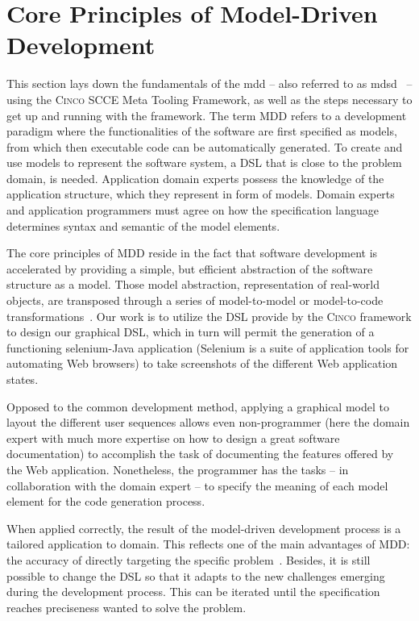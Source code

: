 \section{Core Principles of Model-Driven Development}


This section lays down the fundamentals of the \gls{mdd} -- also referred to as \gls{mdsd}~\cite{fowler} --  using the \textsc{Cinco} SCCE Meta Tooling Framework, as well as the steps necessary to get up and running with the framework. The term MDD refers to a development paradigm where the functionalities of the software are first specified as models, from which then executable code can be automatically generated. To create and use models to represent the software system, a DSL that is close to the problem domain, is needed. Application domain experts possess the knowledge of the application structure, which they represent in form of models. Domain experts and application programmers must agree on how the specification language determines syntax and semantic of the model elements.

The core principles of MDD reside in the fact that software development is accelerated by providing a simple, but efficient abstraction of the software structure as a model. Those model abstraction, representation of real-world objects, are transposed through a series of model-to-model or model-to-code transformations~\cite{stahl_et_al}. Our work is to utilize the DSL provide by the \textsc{Cinco} framework to design our graphical DSL, which in turn will permit the generation of a functioning \gls*{selenium}-Java application (Selenium is a suite of application tools for automating Web browsers) to take screenshots of the different Web application states.

Opposed to the common development method, applying a graphical model to layout the different user sequences allows even non-programmer (here the domain expert with much more expertise on how to design a great software documentation) to accomplish the task of documenting the features offered by the Web application. Nonetheless, the programmer has the tasks -- in collaboration with the domain expert -- to specify the meaning of each model element for the code generation process. 

When applied correctly, the result of the model-driven development process is a tailored application to domain. This reflects one of the main advantages of MDD: the accuracy of directly targeting the specific problem~\cite{brambilla2017model}. Besides, it is still possible to change the DSL so that it adapts to the new challenges emerging during the development process. This can be iterated until the specification reaches preciseness wanted to solve the problem.

